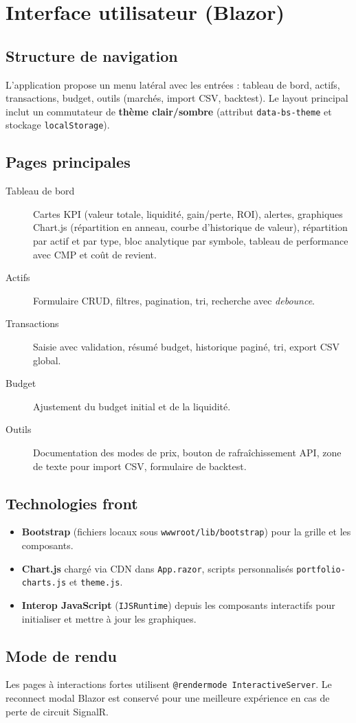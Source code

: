 \chapter{Interface utilisateur (Blazor)}
\label{ch:ui}

\section{Structure de navigation}

L'application propose un menu latéral avec les entrées : tableau de bord, actifs, transactions, budget, outils (marchés, import CSV, backtest). Le layout principal inclut un commutateur de \textbf{thème clair/sombre} (attribut \texttt{data-bs-theme} et stockage \texttt{localStorage}).

\section{Pages principales}

\begin{description}
  \item[Tableau de bord] Cartes KPI (valeur totale, liquidité, gain/perte, ROI), alertes, graphiques Chart.js (répartition en anneau, courbe d'historique de valeur), répartition par actif et par type, bloc analytique par symbole, tableau de performance avec CMP et coût de revient.
  \item[Actifs] Formulaire CRUD, filtres, pagination, tri, recherche avec \emph{debounce}.
  \item[Transactions] Saisie avec validation, résumé budget, historique paginé, tri, export CSV global.
  \item[Budget] Ajustement du budget initial et de la liquidité.
  \item[Outils] Documentation des modes de prix, bouton de rafraîchissement API, zone de texte pour import CSV, formulaire de backtest.
\end{description}

\section{Technologies front}

\begin{itemize}[leftmargin=*]
  \item \textbf{Bootstrap} (fichiers locaux sous \texttt{wwwroot/lib/bootstrap}) pour la grille et les composants.
  \item \textbf{Chart.js} chargé via CDN dans \texttt{App.razor}, scripts personnalisés \texttt{portfolio-charts.js} et \texttt{theme.js}.
  \item \textbf{Interop JavaScript} (\texttt{IJSRuntime}) depuis les composants interactifs pour initialiser et mettre à jour les graphiques.
\end{itemize}

\section{Mode de rendu}

Les pages à interactions fortes utilisent \texttt{@rendermode InteractiveServer}. Le reconnect modal Blazor est conservé pour une meilleure expérience en cas de perte de circuit SignalR.
